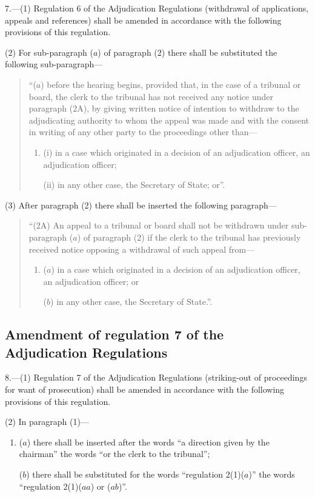 \documentclass[a4paper]{article}
\begin{document}
7.—(1) Regulation 6 of the Adjudication Regulations (withdrawal of applications, appeals and references) shall be amended in accordance with the following provisions of this regulation.

(2) For sub-paragraph ($a$) of paragraph (2) there shall be substituted the following sub-paragraph—
\begin{quotation}
“($a$) before the hearing begins, provided that, in the case of a tribunal or board, the clerk to the tribunal has not received any notice under paragraph (2A), by giving written notice of intention to withdraw to the adjudicating authority to whom the appeal was made and with the consent in writing of any other party to the proceedings other than—
\begin{enumerate}\item[]
(i) in a case which originated in a decision of an adjudication officer, an adjudication officer;

(ii) in any other case, the Secretary of State; or”.
\end{enumerate}
\end{quotation}

(3) After paragraph (2) there shall be inserted the following paragraph—
\begin{quotation}
“(2A) An appeal to a tribunal or board shall not be withdrawn under sub-paragraph ($a$) of paragraph (2) if the clerk to the tribunal has previously received notice opposing a withdrawal of such appeal from—
\begin{enumerate}\item[]
($a$) in a case which originated in a decision of an adjudication officer, an adjudication officer; or

($b$) in any other case, the Secretary of State.”.
\end{enumerate}
\end{quotation}

\subsection[8. Amendment of regulation 7 of the Adjudication Regulations]{Amendment of regulation 7 of the Adjudication Regulations}

8.—(1) Regulation 7 of the Adjudication Regulations (striking-out of proceedings for want of prosecution) shall be amended in accordance with the following provisions of this regulation.

(2) In paragraph (1)—
\begin{enumerate}\item[]
($a$) there shall be inserted after the words “a direction given by the chairman” the words “or the clerk to the tribunal”;

($b$) there shall be substituted for the words “regulation 2(1)($a$)” the words “regulation 2(1)($aa$) or ($ab$)”.
\end{enumerate}
\end{document}
